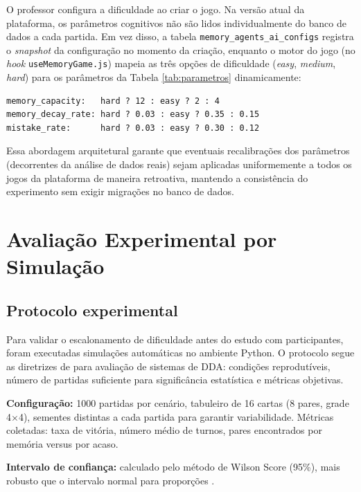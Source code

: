 \documentclass[
    12pt,
    openright,
    twoside,
    a4paper,
    english,
    brazil
]{abntex2}
\begin{document}
O professor configura a dificuldade ao criar o jogo. Na versão atual da plataforma, os parâmetros cognitivos não são lidos individualmente do banco de dados a cada partida. Em vez disso, a tabela \texttt{memory\_agents\_ai\_configs} registra o \textit{snapshot} da configuração no momento da criação, enquanto o motor do jogo (no \textit{hook} \texttt{useMemoryGame.js}) mapeia as três opções de dificuldade (\textit{easy}, \textit{medium}, \textit{hard}) para os parâmetros da Tabela \ref{tab:parametros} dinamicamente:

\begin{verbatim}
memory_capacity:   hard ? 12 : easy ? 2 : 4
memory_decay_rate: hard ? 0.03 : easy ? 0.35 : 0.15
mistake_rate:      hard ? 0.03 : easy ? 0.30 : 0.12
\end{verbatim}

Essa abordagem arquitetural garante que eventuais recalibrações dos parâmetros (decorrentes da análise de dados reais) sejam aplicadas uniformemente a todos os jogos da plataforma de maneira retroativa, mantendo a consistência do experimento sem exigir migrações no banco de dados.

\chapter{Avaliação Experimental por Simulação}

\section{Protocolo experimental}

Para validar o escalonamento de dificuldade antes do estudo com participantes, foram executadas simulações automáticas no ambiente Python. O protocolo segue as diretrizes de  para avaliação de sistemas de DDA: condições reprodutíveis, número de partidas suficiente para significância estatística e métricas objetivas.

\textbf{Configuração:} 1000 partidas por cenário, tabuleiro de 16 cartas (8 pares, grade 4$\times$4), sementes distintas a cada partida para garantir variabilidade. Métricas coletadas: taxa de vitória, número médio de turnos, pares encontrados por memória versus por acaso.

\textbf{Intervalo de confiança:} calculado pelo método de Wilson Score (95\%), mais robusto que o intervalo normal para proporções \cite{zohaib2018}.
\end{document}
